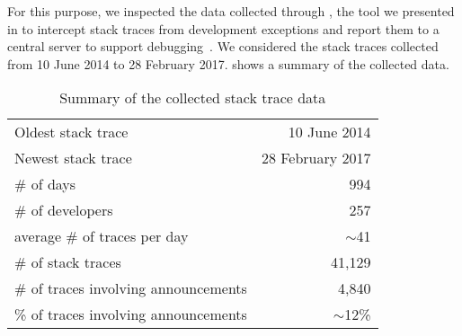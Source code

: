 For this purpose, we inspected the data collected through \sln, the tool we presented in  to intercept stack traces from development exceptions and report them to a central server to support debugging~\cite{DalS2015a}.
We considered the stack traces collected from 10 June 2014 to 28 February 2017.
 shows a summary of the collected data.

\begin{table}[ht]\small
\centering
\caption{Summary of the collected stack trace data}
\begin{tabular}{lr}
\hline
Oldest stack trace & 10 June 2014 \\
Newest stack trace & 28 February 2017 \\
\# of days & 994\\
\# of developers & 257\\
average \# of traces per day & $\sim$41\\
\# of stack traces & 41,129 \\
\# of traces involving announcements & 4,840 \\
\% of traces involving announcements & $\sim$12\% \\
\hline
\end{tabular}
\label{tab:stack-traces}
\end{table}



